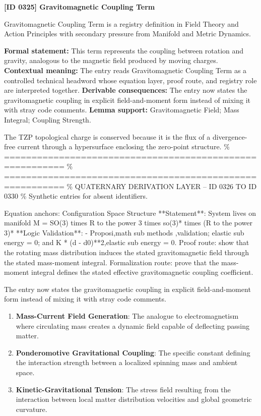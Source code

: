 \clearpage
\noindent\textbf{[ID 0325] Gravitomagnetic Coupling Term}\par
\vspace{0.35em}
\begingroup\small
{}
Gravitomagnetic Coupling Term is a registry definition in Field Theory and Action Principles with secondary pressure from Manifold and Metric Dynamics.

\begingroup\footnotesize\setlength{\emergencystretch}{3em}\sloppy
\textbf{Formal statement:} This term represents the coupling between rotation and gravity, analogous to the magnetic field produced by moving charges. \textbf{Contextual meaning:} The entry reads Gravitomagnetic Coupling Term as a controlled technical headword whose equation layer, proof route, and registry role are interpreted together. \textbf{Derivable consequences:} The entry now states the gravitomagnetic coupling in explicit field-and-moment form instead of mixing it with stray code comments. \textbf{Lemma support:} Gravitomagnetic Field; Mass Integral; Coupling Strength.\par
\endgroup

The TZP topological charge is conserved because it is the flux of a divergence-free current through a hypersurface enclosing the zero-point structure. \% ========================================================= \% ========================================================= \% QUATERNARY DERIVATION LAYER -- ID 0326 TO ID 0330 \% Synthetic entries for absent identifiers.

Equation anchors: Configuration Space Structure **Statement**: System lives on manifold M = SO(3) times R to the power 3 times so(3)* times (R to the power 3)* **Logic Validation**: - Proposi,math sub methods ,validation; elastic sub energy = 0; and K * (d - d0)**2,elastic sub energy = 0. Proof route: show that the rotating mass distribution induces the stated gravitomagnetic field through the stated mass-moment integral. Formalization route: prove that the mass-moment integral defines the stated effective gravitomagnetic coupling coefficient.

The entry now states the gravitomagnetic coupling in explicit field-and-moment form instead of mixing it with stray code comments.
\endgroup

\begin{enumerate}[leftmargin=1.6em,itemsep=6pt,topsep=4pt]
\item \textbf{Mass-Current Field Generation}: The analogue to electromagnetism where circulating mass creates a dynamic field capable of deflecting passing matter.
\item \textbf{Ponderomotive Gravitational Coupling}: The specific constant defining the interaction strength between a localized spinning mass and ambient space.
\item \textbf{Kinetic-Gravitational Tension}: The stress field resulting from the interaction between local matter distribution velocities and global geometric curvature.
\end{enumerate}

